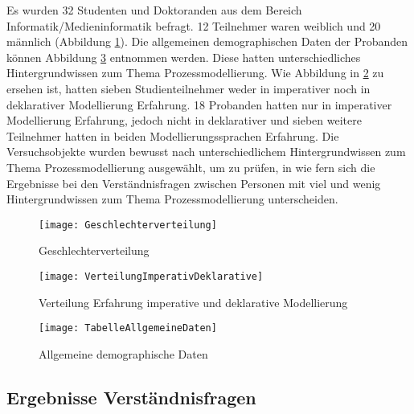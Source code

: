 Es wurden 32 Studenten und Doktoranden aus dem Bereich Informatik/Medieninformatik befragt. 12 Teilnehmer waren weiblich und 20 männlich (Abbildung \ref{fig:Geschlechterverteilung}). Die allgemeinen demographischen Daten der Probanden können Abbildung \ref{fig:TabelleAllgemeineDaten} entnommen werden. Diese hatten unterschiedliches Hintergrundwissen zum Thema Prozessmodellierung. Wie Abbildung in \ref{fig:VerteilungImperativDeklarative} zu ersehen ist, hatten sieben Studienteilnehmer weder in imperativer noch in deklarativer Modellierung Erfahrung. 18 Probanden hatten nur in imperativer Modellierung Erfahrung, jedoch nicht in deklarativer und sieben weitere Teilnehmer hatten in beiden Modellierungssprachen Erfahrung. Die Versuchsobjekte wurden bewusst nach unterschiedlichem Hintergrundwissen zum Thema Prozessmodellierung ausgewählt, um zu prüfen, in wie fern sich die Ergebnisse bei den Verständnisfragen zwischen Personen mit viel und wenig Hintergrundwissen zum Thema Prozessmodellierung unterscheiden.\newline

\begin{figure}[htp]
\begin{center}
  \texttt{[image: Geschlechterverteilung]} %
  \caption{Geschlechterverteilung}
  \label{fig:Geschlechterverteilung}
\end{center}
\end{figure}

\begin{figure}[htp]
\begin{center}
  \texttt{[image: VerteilungImperativDeklarative]} %
  \caption{Verteilung Erfahrung imperative und deklarative Modellierung}
  \label{fig:VerteilungImperativDeklarative}
\end{center}
\end{figure}

\begin{figure}[htp]
\begin{center}
  \texttt{[image: TabelleAllgemeineDaten]} %
  \caption{Allgemeine demographische Daten}
  \label{fig:TabelleAllgemeineDaten}
\end{center}
\end{figure}



\subsection{Ergebnisse Verständnisfragen}

